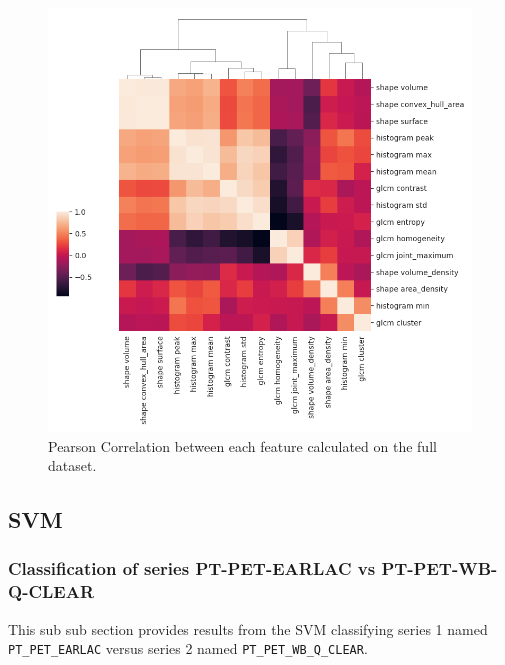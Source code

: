 \begin{figure}[H]
    \centering
    \includegraphics[width=1\textwidth]{Figures/feature_correlation.png}
    \caption{Pearson Correlation between each feature calculated on the full
    dataset. }  
    \label{fig:correlation} 
\end{figure}








\subsection{SVM}

\subsubsection{Classification of series PT-PET-EARLAC vs PT-PET-WB-Q-CLEAR}
\label{sec:SVM0}
This sub sub section provides results from the SVM classifying series 1 named \verb|PT_PET_EARLAC|
versus series 2 named \verb|PT_PET_WB_Q_CLEAR|. 

